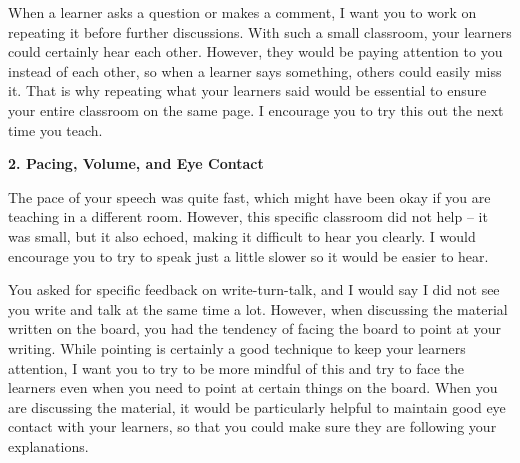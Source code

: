 \documentclass{article}
\begin{document}
When a learner asks a question or makes a comment, I want you to work on repeating it before further discussions. With such a small classroom, your learners could certainly hear each other. However, they would be paying attention to you instead of each other, so when a learner says something, others could easily miss it. That is why repeating what your learners said would be essential to ensure your entire classroom on the same page. I encourage you to try this out the next time you teach.

\textbf{2. Pacing, Volume, and Eye Contact}

The pace of your speech was quite fast, which might have been okay if you are teaching in a different room. However, this specific classroom did not help – it was small, but it also echoed, making it difficult to hear you clearly. I would encourage you to try to speak just a little slower so it would be easier to hear.

You asked for specific feedback on write-turn-talk, and I would say I did not see you write and talk at the same time a lot. However, when discussing the material written on the board, you had the tendency of facing the board to point at your writing. While pointing is certainly a good technique to keep your learners attention, I want you to try to be more mindful of this and try to face the learners even when you need to point at certain things on the board. When you are discussing the material, it would be particularly helpful to maintain good eye contact with your learners, so that you could make sure they are following your explanations.

\section{}
\end{document}
